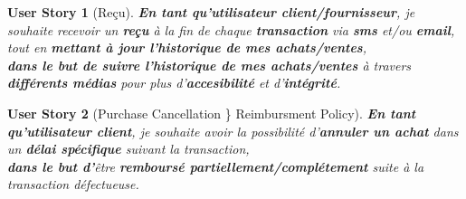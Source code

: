 \documentclass[a4paper,12pt]{book}
\theoremstyle{break}
\newtheorem*{userStory}{User Story}
\theoremstyle{break}
\theoremstyle{break}
\theoremstyle{break}
\theoremstyle{definition}
\theoremstyle{remark}
\begin{document}
\begin{userStory}[Reçu]
\textbf{En tant qu'utilisateur {\color{green}client}/{\color{red}fournisseur}}, je souhaite recevoir un \textbf{reçu} à la fin de chaque \textbf{transaction} via \textbf{sms} et/ou \textbf{email}, tout en \textbf{mettant à jour l'historique de mes achats/ventes},\\
\indent
\textbf{dans le but de suivre l'historique de mes achats/ventes} à travers \textbf{différents médias} pour plus d'\textbf{accesibilité} et d'\textbf{intégrité}.
\end{userStory}

\begin{userStory}[Purchase Cancellation \} Reimbursment Policy]
\textbf{En tant qu'utilisateur {\color{green}client}}, je souhaite avoir la possibilité d'\textbf{annuler un achat} dans un \textbf{délai spécifique} suivant la transaction,\\
\indent
\textbf{dans le but d'}être \textbf{remboursé partiellement/complétement} suite à la transaction défectueuse.
\end{userStory}
\end{document}

